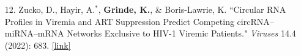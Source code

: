 \documentclass[margin]{res}
\begin{document}
\begin{resume}
\begin{itemize}
\item[12.] Zucko, D., Hayir, A.$^*$,  \textbf{Grinde, K.}, \& Boris-Lawrie, K. ``Circular RNA Profiles in Viremia and ART Suppression Predict Competing circRNA– miRNA–mRNA Networks Exclusive to HIV-1 Viremic Patients." \textit{Viruses} 14.4 (2022): 683. 
\href{https://www.mdpi.com/1999-4915/14/4/683}{[link]}


\end{itemize}
\end{resume}
\end{document}
